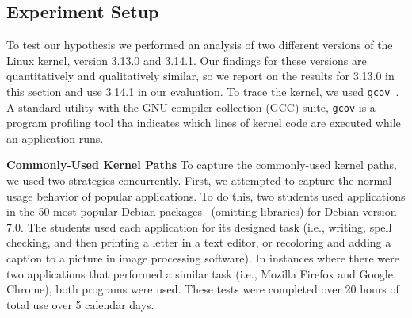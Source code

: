 %
%

\subsection{Experiment Setup}

To test our hypothesis we performed an analysis of two different versions of
the Linux kernel, version 3.13.0 and 3.14.1.  Our findings for these
versions are quantitatively and qualitatively similar, so we report on
the results for 3.13.0 in this section and use 3.14.1 in our evaluation.
To trace the kernel, we used \texttt{gcov}~\cite{gcov}. A standard utility with
the GNU compiler collection (GCC) suite,
\texttt{gcov} is a program profiling tool tha indicates which lines of kernel
code are executed while an application runs.

\textbf{Commonly-Used Kernel Paths}
To capture the commonly-used kernel paths, we used two strategies concurrently.
First, we attempted to capture the normal usage behavior of popular applications.
To do this, two students used
applications in the 50 most popular Debian packages~\cite{Top-Packages}
(omitting libraries) for Debian version 7.0.
The students used each application for its designed
task (i.e., writing, spell checking, and then printing a letter in a text
editor, or recoloring and adding a caption to a picture in image processing
software). In instances where there were two applications that performed a
similar task (i.e., Mozilla Firefox and Google Chrome), both programs were
used. These tests were completed over 20 hours of
total use over 5 calendar days.

